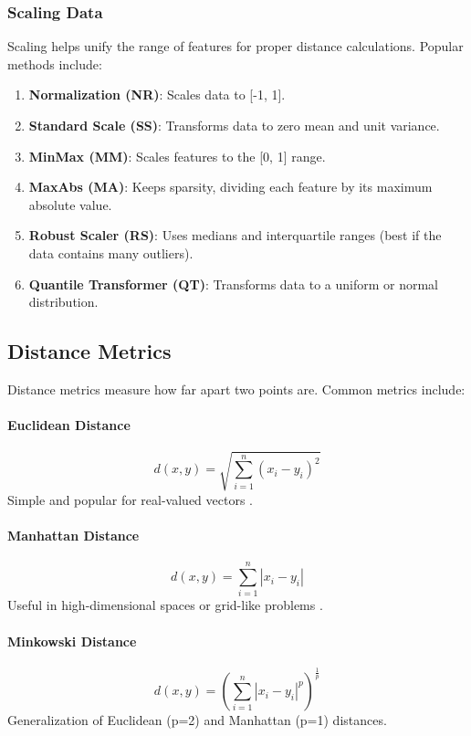 \documentclass[10pt,twocolumn]{article}
\begin{document}
\subsubsection{Scaling Data}
Scaling \cite{ahsan2021} helps unify the range of features for proper distance calculations. Popular methods include:
\begin{enumerate}
\item \textbf{Normalization (NR)}: Scales data to [-1, 1].
\item \textbf{Standard Scale (SS)}: Transforms data to zero mean and unit variance.
\item \textbf{MinMax (MM)}: Scales features to the [0, 1] range.
\item \textbf{MaxAbs (MA)}: Keeps sparsity, dividing each feature by its maximum absolute value.
\item \textbf{Robust Scaler (RS)}: Uses medians and interquartile ranges (best if the data contains many outliers).
\item \textbf{Quantile Transformer (QT)}: Transforms data to a uniform or normal distribution.
\end{enumerate}

\subsection{Distance Metrics}
Distance metrics \cite{sciencedirect2024} measure how far apart two points are. Common metrics include:

\paragraph{Euclidean Distance}
\begin{equation}
    d(x, y) = \sqrt{\sum_{i=1}^{n} (x_i - y_i)^2}
\end{equation}
Simple and popular for real-valued vectors \cite{ibm2024}.

\paragraph{Manhattan Distance}
\begin{equation}
    d(x, y) = \sum_{i=1}^{n} |x_i - y_i|
\end{equation}
Useful in high-dimensional spaces or grid-like problems \cite{datacamp2024}.

\paragraph{Minkowski Distance}
\begin{equation}
    d(x, y) = \left(\sum_{i=1}^{n} |x_i - y_i|^p\right)^{\frac{1}{p}}
\end{equation}
Generalization of Euclidean (p=2) and Manhattan (p=1) distances.
\end{document}
